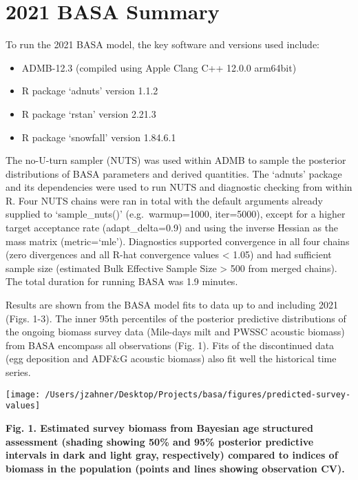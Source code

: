 \documentclass[
  11pt,
]{article}
\providecommand{\tightlist}{%
  \setlength{\itemsep}{0pt}\setlength{\parskip}{0pt}}
\begin{document}
\hypertarget{basa-summary}{%
\section{2021 BASA Summary}\label{basa-summary}}

To run the 2021 BASA model, the key software and versions used include:

\begin{itemize}
\tightlist
\item
  ADMB-12.3 (compiled using Apple Clang C++ 12.0.0 arm64bit)
\item
  R package `adnuts' version 1.1.2
\item
  R package `rstan' version 2.21.3
\item
  R package `snowfall' version 1.84.6.1
\end{itemize}

The no-U-turn sampler (NUTS) was used within ADMB to sample the
posterior distributions of BASA parameters and derived quantities. The
`adnuts' package and its dependencies were used to run NUTS and
diagnostic checking from within R. Four NUTS chains were ran in total
with the default arguments already supplied to `sample\_nuts()'
(e.g.~warmup=1000, iter=5000), except for a higher target acceptance
rate (adapt\_delta=0.9) and using the inverse Hessian as the mass matrix
(metric=`mle'). Diagnostics supported convergence in all four chains
(zero divergences and all R-hat convergence values \textless{} 1.05) and
had sufficient sample size (estimated Bulk Effective Sample Size
\textgreater{} 500 from merged chains). The total duration for running
BASA was 1.9 minutes.

Results are shown from the BASA model fits to data up to and including
2021 (Figs. 1-3). The inner 95th percentiles of the posterior predictive
distributions of the ongoing biomass survey data (Mile-days milt and
PWSSC acoustic biomass) from BASA encompass all observations (Fig. 1).
Fits of the discontinued data (egg deposition and ADF\&G acoustic
biomass) also fit well the historical time series.

\begin{center}\texttt{[image: /Users/jzahner/Desktop/Projects/basa/figures/predicted-survey-values]} \end{center}

\textbf{Fig. 1. Estimated survey biomass from Bayesian age structured
assessment (shading showing 50\% and 95\% posterior predictive intervals
in dark and light gray, respectively) compared to indices of biomass in
the population (points and lines showing observation CV).}
\end{document}
